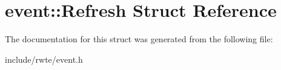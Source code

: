\hypertarget{structevent_1_1Refresh}{}\section{event\+::Refresh Struct Reference}
\label{structevent_1_1Refresh}


The documentation for this struct was generated from the following file\+:\begin{DoxyCompactItemize}
\item 
include/rwte/event.\+h\end{DoxyCompactItemize}
